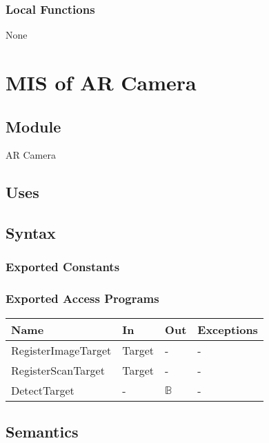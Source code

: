 \documentclass[12pt, titlepage]{article}
\begin{document}
\subsubsection{Local Functions}

None

\newpage

\section{MIS of AR Camera} \label{mARCamera}

\subsection{Module}

AR Camera

\subsection{Uses}

\subsection{Syntax}

\subsubsection{Exported Constants}

\subsubsection{Exported Access Programs}

\begin{center}
\begin{tabular}{p{4cm} p{4cm} p{4cm} p{2cm}}
\hline
\textbf{Name} & \textbf{In} & \textbf{Out} & \textbf{Exceptions} \\
\hline
RegisterImageTarget & Target & - & - \\
RegisterScanTarget & Target & - & - \\
DetectTarget & - & $\mathbb{B}$ & - \\

\hline
\end{tabular}
\end{center}

\subsection{Semantics}
\end{document}
